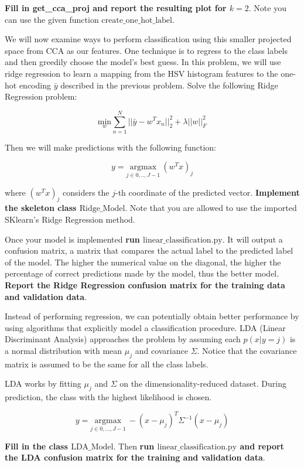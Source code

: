 \begin{Parts}
{\bf Fill in \mbox{get\_cca\_proj} and report the resulting plot for $k=2$}. Note you can use the given function $\mbox{create\_one\_hot\_label}$.




\Part We will now examine ways to perform classification using this
smaller projected space from CCA as our features. One technique is to regress to the class labels and then greedily choose the model's best guess. In this problem, we will use ridge regression to learn a mapping from the HSV histogram features to the one-hot encoding $\bar{y}$ described in the previous problem.  Solve the following Ridge Regression problem:

$$\underset{w}{\mbox{min}} \sum^{N}_{n=1} ||\bar{y} - w^Tx_n||_2^2 + \lambda ||w||^2_F$$

Then we will make predictions with the following function:

$$y = \underset{j\in{0,..,J-1}}{\mbox{argmax}} \: (w^Tx)_j$$

where $(w^Tx)_j$ considers the $j$-th coordinate of the predicted vector. {\bf Implement the skeleton class $\mbox{Ridge\_Model}$}. Note that you are allowed to use the imported SKlearn's Ridge Regression method. 

Once your model is implemented {\bf run $\mbox{linear\_classification.py}$}. It will output a confusion matrix, a matrix that compares the actual label to the predicted label of the model. The higher the numerical value on the diagonal, the higher the percentage of correct predictions made by the model, thus the better model. {\bf Report the Ridge Regression confusion matrix for the training data and validation data}.



\Part Instead of performing regression, we can potentially obtain better performance by using algorithms that explicitly model a classification procedure. LDA (Linear Discriminant Analysis) approaches the problem by assuming each $p(x | y =j)$ is a normal distribution with mean $\mu_j$ and covariance $\Sigma$. Notice that the covariance matrix is assumed to be the same for all the class labels. 

LDA works by fitting $\mu_j$ and $\Sigma$ on the dimensionality-reduced dataset. During prediction, the class with the highest likelihood is chosen. 

$$y = \underset{j\in{0,...,J-1}}{\mbox{argmax}} \: -(x-\mu_j)^T\Sigma^{-1}(x-\mu_j)$$

{\bf Fill in the class $\mbox{LDA\_Model}$}. Then {\bf run $\mbox{linear\_classification.py}$ and report the LDA confusion matrix for the training and validation data}.






\end{Parts}
